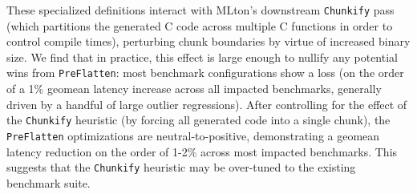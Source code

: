 


These specialized definitions interact with MLton's downstream \texttt{Chunkify}
pass (which partitions the generated C code across multiple C functions in order
to control compile times), perturbing chunk boundaries by virtue of increased
binary size. We find that in practice, this effect is large enough to nullify
any potential wins from \texttt{PreFlatten}: most benchmark configurations show
a loss (on the order of a 1\% geomean latency increase across all impacted
benchmarks, generally driven by a handful of large outlier regressions). After
controlling for the effect of the \texttt{Chunkify} heuristic (by forcing all
generated code into a single chunk), the \texttt{PreFlatten} optimizations are
neutral-to-positive, demonstrating a geomean latency reduction on the order of
1-2\% across most impacted benchmarks. This suggests that the \texttt{Chunkify}
heuristic may be over-tuned to the existing benchmark suite.


